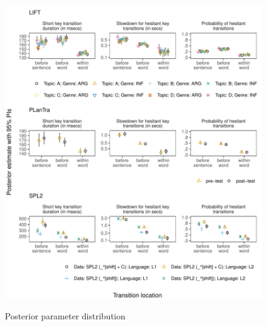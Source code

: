 \documentclass[
  english,
  man,floatsintext]{apa7}
\begin{document}
\begin{appendix}
\begin{figure}[!htb]
\includegraphics{figures/psplots2.pdf}
\label{fig:fullps1}
\caption{Posterior parameter distribution}
\end{figure}
\end{appendix}

\clearpage
\makeatletter
\efloat@restorefloats
\makeatother
\end{document}
